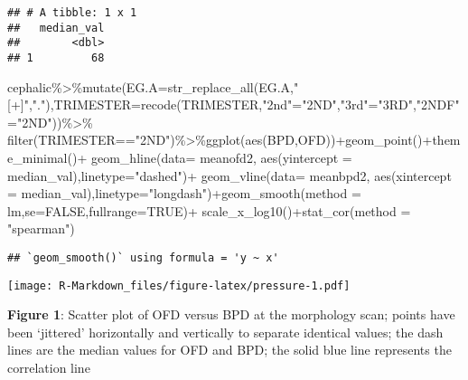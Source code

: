 \documentclass[
]{article}
\newenvironment{Shaded}{\begin{snugshade}}{\end{snugshade}}
\newcommand{\AttributeTok}[1]{\textcolor[rgb]{0.77,0.63,0.00}{#1}}
\newcommand{\ConstantTok}[1]{\textcolor[rgb]{0.00,0.00,0.00}{#1}}
\newcommand{\FunctionTok}[1]{\textcolor[rgb]{0.00,0.00,0.00}{#1}}
\newcommand{\NormalTok}[1]{#1}
\newcommand{\OtherTok}[1]{\textcolor[rgb]{0.56,0.35,0.01}{#1}}
\newcommand{\SpecialCharTok}[1]{\textcolor[rgb]{0.00,0.00,0.00}{#1}}
\newcommand{\StringTok}[1]{\textcolor[rgb]{0.31,0.60,0.02}{#1}}
\begin{document}
\begin{verbatim}
## # A tibble: 1 x 1
##   median_val
##        <dbl>
## 1         68
\end{verbatim}

\begin{Shaded}
\begin{Highlighting}[]
\NormalTok{cephalic}\SpecialCharTok{\%\textgreater{}\%}\FunctionTok{mutate}\NormalTok{(}\AttributeTok{EG.A=}\FunctionTok{str\_replace\_all}\NormalTok{(EG.A,}\StringTok{"[+]"}\NormalTok{,}\StringTok{"."}\NormalTok{),}\AttributeTok{TRIMESTER=}\FunctionTok{recode}\NormalTok{(TRIMESTER,}\StringTok{"2nd"}\OtherTok{=}\StringTok{"2ND"}\NormalTok{,}\StringTok{"3rd"}\OtherTok{=}\StringTok{"3RD"}\NormalTok{,}\StringTok{"2NDF"}\OtherTok{=}\StringTok{"2ND"}\NormalTok{))}\SpecialCharTok{\%\textgreater{}\%}
  \FunctionTok{filter}\NormalTok{(TRIMESTER}\SpecialCharTok{==}\StringTok{"2ND"}\NormalTok{)}\SpecialCharTok{\%\textgreater{}\%}\FunctionTok{ggplot}\NormalTok{(}\FunctionTok{aes}\NormalTok{(BPD,OFD))}\SpecialCharTok{+}\FunctionTok{geom\_point}\NormalTok{()}\SpecialCharTok{+}\FunctionTok{theme\_minimal}\NormalTok{()}\SpecialCharTok{+}
  \FunctionTok{geom\_hline}\NormalTok{(}\AttributeTok{data=}\NormalTok{ meanofd2, }\FunctionTok{aes}\NormalTok{(}\AttributeTok{yintercept =}\NormalTok{ median\_val),}\AttributeTok{linetype=}\StringTok{"dashed"}\NormalTok{)}\SpecialCharTok{+}
  \FunctionTok{geom\_vline}\NormalTok{(}\AttributeTok{data=}\NormalTok{ meanbpd2, }\FunctionTok{aes}\NormalTok{(}\AttributeTok{xintercept =}\NormalTok{ median\_val),}\AttributeTok{linetype=}\StringTok{"longdash"}\NormalTok{)}\SpecialCharTok{+}\FunctionTok{geom\_smooth}\NormalTok{(}\AttributeTok{method =}\NormalTok{ lm,}\AttributeTok{se=}\ConstantTok{FALSE}\NormalTok{,}\AttributeTok{fullrange=}\ConstantTok{TRUE}\NormalTok{)}\SpecialCharTok{+}
  \FunctionTok{scale\_x\_log10}\NormalTok{()}\SpecialCharTok{+}\FunctionTok{stat\_cor}\NormalTok{(}\AttributeTok{method =} \StringTok{"spearman"}\NormalTok{)}
\end{Highlighting}
\end{Shaded}

\begin{verbatim}
## `geom_smooth()` using formula = 'y ~ x'
\end{verbatim}

\texttt{[image: R-Markdown\_files/figure-latex/pressure-1.pdf]}

\textbf{Figure 1}: Scatter plot of OFD versus BPD at the morphology
scan; points have been `jittered' horizontally and vertically to
separate identical values; the dash lines are the median values for OFD
and BPD; the solid blue line represents the correlation line
\end{document}
